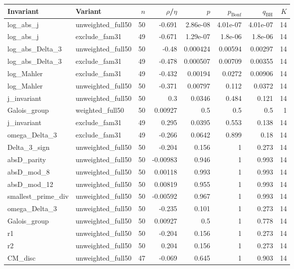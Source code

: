 \begin{tabular}{llrrrrrr}
\hline
Invariant & Variant & $n$ & $\rho$/$\eta$ & $p$ & $p_{\text{Bonf}}$ & $q_{\text{BH}}$ & $K$ \\
\hline
log\_abs\_j & unweighted\_full50 & 50 & -0.691 & 2.86e-08 & 4.01e-07 & 4.01e-07 & 14 \\
log\_abs\_j & exclude\_fam31 & 49 & -0.671 & 1.29e-07 & 1.8e-06 & 1.8e-06 & 14 \\
log\_abs\_Delta\_3 & unweighted\_full50 & 50 & -0.48 & 0.000424 & 0.00594 & 0.00297 & 14 \\
log\_abs\_Delta\_3 & exclude\_fam31 & 49 & -0.478 & 0.000507 & 0.00709 & 0.00355 & 14 \\
log\_Mahler & exclude\_fam31 & 49 & -0.432 & 0.00194 & 0.0272 & 0.00906 & 14 \\
log\_Mahler & unweighted\_full50 & 50 & -0.371 & 0.00797 & 0.112 & 0.0372 & 14 \\
j\_invariant & unweighted\_full50 & 50 & 0.3 & 0.0346 & 0.484 & 0.121 & 14 \\
Galois\_group & weighted\_full50 & 50 & 0.00927 & 0.5 & 0.5 & 0.5 & 1 \\
j\_invariant & exclude\_fam31 & 49 & 0.295 & 0.0395 & 0.553 & 0.138 & 14 \\
omega\_Delta\_3 & exclude\_fam31 & 49 & -0.266 & 0.0642 & 0.899 & 0.18 & 14 \\
Delta\_3\_sign & unweighted\_full50 & 50 & -0.204 & 0.156 & 1 & 0.273 & 14 \\
absD\_parity & unweighted\_full50 & 50 & -0.00983 & 0.946 & 1 & 0.993 & 14 \\
absD\_mod\_8 & unweighted\_full50 & 50 & 0.00118 & 0.993 & 1 & 0.993 & 14 \\
absD\_mod\_12 & unweighted\_full50 & 50 & 0.00819 & 0.955 & 1 & 0.993 & 14 \\
smallest\_prime\_div & unweighted\_full50 & 50 & -0.00592 & 0.967 & 1 & 0.993 & 14 \\
omega\_Delta\_3 & unweighted\_full50 & 50 & -0.235 & 0.101 & 1 & 0.273 & 14 \\
Galois\_group & unweighted\_full50 & 50 & 0.00927 & 0.5 & 1 & 0.778 & 14 \\
r1 & unweighted\_full50 & 50 & -0.204 & 0.156 & 1 & 0.273 & 14 \\
r2 & unweighted\_full50 & 50 & 0.204 & 0.156 & 1 & 0.273 & 14 \\
CM\_disc & unweighted\_full50 & 47 & -0.069 & 0.645 & 1 & 0.903 & 14 \\

\end{tabular}
